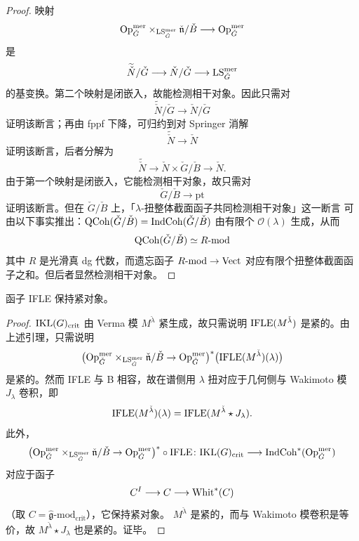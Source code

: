 \begin{proof}
映射
\[
\mathrm{Op}^{\mathrm{mer}}_{\check G}\times_{\mathrm{LS}^{\mathrm{mer}}_{\check G}}\check{\mathfrak{n}}/\check B
\longrightarrow \mathrm{Op}^{\mathrm{mer}}_{\check G}
\]
是
\[
\widetilde{\check N}/\check G\longrightarrow \check N/\check G
\longrightarrow \mathrm{LS}^{\mathrm{mer}}_{\check G}
\]
的基变换。第二个映射是闭嵌入，故能检测相干对象。因此只需对
\[
\widetilde{\check N}/\check G\longrightarrow \check N/\check G
\]
证明该断言；再由 fppf 下降，可归约到对 Springer 消解
\[
\widetilde{\check N}\longrightarrow \check N
\]
证明该断言，后者分解为
\[
\widetilde{\check N}\longrightarrow \check N\times \check G/\check B\longrightarrow \check N.
\]
由于第一个映射是闭嵌入，它能检测相干对象，故只需对
\[
\check G/\check B\longrightarrow \mathrm{pt}
\]
证明该断言。但在 $\check G/\check B$ 上，「$\lambda$-扭整体截面函子共同检测相干对象」这一断言
可由以下事实推出：$\mathrm{QCoh}(\check G/\check B)=\mathrm{IndCoh}(\check G/\check B)$ 由有限个
$\mathcal{O}(\lambda)$ 生成，从而
\[
\mathrm{QCoh}(\check G/\check B)\simeq R\text{-}\mathrm{mod}
\]
其中 $R$ 是光滑真 dg 代数，而遗忘函子
$R\text{-}\mathrm{mod}\to \mathrm{Vect}$ 对应有限个扭整体截面函子之和。但后者显然检测相干对象。
\end{proof}

\begin{proposition}\label{prop:3.4.2.4}
函子 IFLE 保持紧对象。
\end{proposition}

\begin{proof}
$\mathrm{IKL}(G)_{\mathrm{crit}}$ 由 Verma 模 $M^{\check\lambda}$ 紧生成，故只需说明
$\mathrm{IFLE}(M^{\check\lambda})$ 是紧的。由上述引理，只需说明
\[
\bigl(\mathrm{Op}^{\mathrm{mer}}_{\check G}\times_{\mathrm{LS}^{\mathrm{mer}}_{\check G}}
\check{\mathfrak{n}}/\check B\to \mathrm{Op}^{\mathrm{mer}}_{\check G}\bigr)^{*}
\bigl(\mathrm{IFLE}(M^{\check\lambda})(\lambda)\bigr)
\]
是紧的。然而 IFLE 与 B 相容，故在谱侧用 $\lambda$ 扭对应于几何侧与 Wakimoto 模
$J_{\lambda}$ 卷积，即
\[
\mathrm{IFLE}(M^{\check\lambda})(\lambda)=\mathrm{IFLE}(M^{\check\lambda}\star J_{\lambda}).
\]
此外，
\[
\bigl(\mathrm{Op}^{\mathrm{mer}}_{\check G}\times_{\mathrm{LS}^{\mathrm{mer}}_{\check G}}
\check{\mathfrak{n}}/\check B\to \mathrm{Op}^{\mathrm{mer}}_{\check G}\bigr)^{*}\circ \mathrm{IFLE}\colon
\mathrm{IKL}(G)_{\mathrm{crit}}\longrightarrow \mathrm{IndCoh}^{*}(\mathrm{Op}^{\mathrm{mer}}_{\check G})
\]
对应于函子
\[
C^{I}\longrightarrow C\longrightarrow \mathrm{Whit}^{*}(C)
\]
（取 $C=\hat{\mathfrak{g}}\text{-}\mathrm{mod}_{\mathrm{crit}}$），它保持紧对象。
$M^{\check\lambda}$ 是紧的，而与 Wakimoto 模卷积是等价，故 $M^{\check\lambda}\star J_{\lambda}$
也是紧的。证毕。
\end{proof}
